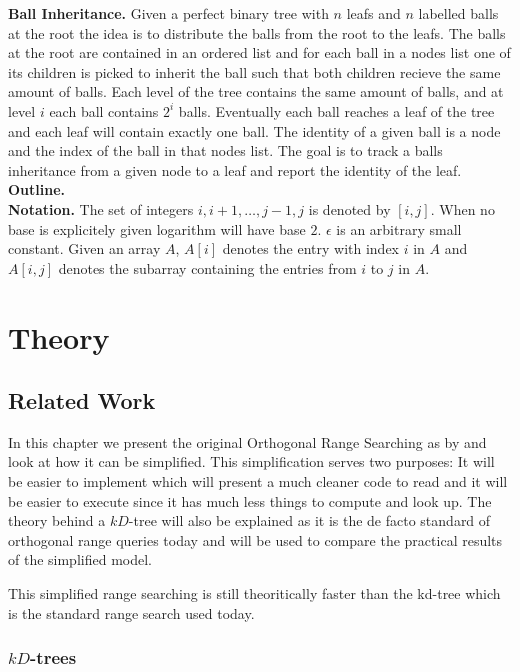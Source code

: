 \documentclass[twoside,11pt,openright]{report}
\begin{document}
\noindent \textbf{Ball Inheritance.} Given a perfect binary tree with $n$ leafs and $n$ labelled balls at the root the idea is to distribute the balls from the root to the leafs. The balls at the root are contained in an ordered list and for each ball in a nodes list one of its children is picked to inherit the ball such that both children recieve the same amount of balls. Each level of the tree contains the same amount of balls, and at level $i$ each ball contains $2^i$ balls. Eventually each ball reaches a leaf of the tree and each leaf will contain exactly one ball. The identity of a given ball is a node and the index of the ball in that nodes list. The goal is to track a balls inheritance from a given node to a leaf and report the identity of the leaf. \\


\noindent \textbf{Outline.} \\

\noindent \textbf{Notation.} The set of integers ${i, i+1, \dots, j-1, j}$ is denoted by $[i,j]$. When no base is explicitely given logarithm will have base $2$. $\epsilon$ is an arbitrary small constant. Given an array $A$, $A[i]$ denotes the entry with index $i$ in $A$ and $A[i,j]$ denotes the subarray containing the entries from $i$ to $j$ in $A$.


\part{Theory}
\chapter{Related Work}

In this chapter we present the original Orthogonal Range Searching as by \citet{chanetal} and look at how it can be simplified. This simplification serves two purposes: It will be easier to implement which will present a much cleaner code to read and it will be easier to execute since it has much less things to compute and look up. The theory behind a $kD$-tree will also be explained as it is the de facto standard of orthogonal range queries today and will be used to compare the practical results of the simplified model.

This simplified range searching is still theoritically faster than the kd-tree which is the standard range search used today. 

\section{$kD$-trees}
\end{document}
